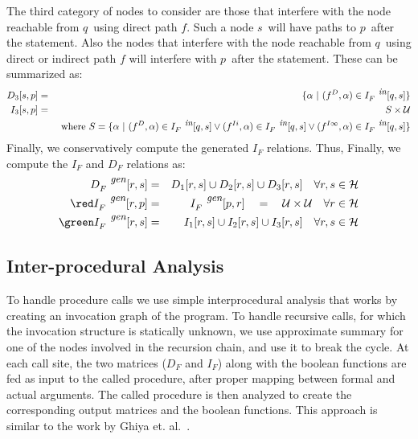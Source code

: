 \documentclass[runningheads,a4paper]{llncs}
\newcommand{\p}{\ensuremath{p}}
\newcommand{\q}{\ensuremath{q}}
\newcommand{\s}{\ensuremath{s}}
\newcommand{\myr}{\ensuremath{r}}
\newcommand{\drct}{\ensuremath{D}}
\newcommand{\indrct}{\ensuremath{I}}
\newcommand{\heap}{\ensuremath{\mathcal{H}}}
\newcommand{\upath}{\ensuremath{\mathcal{U}}}
\newcommand{\din}{\mbox{\footnotesize\em in}}
\newcommand{\dgen}{\mbox{\footnotesize\em gen}}
\begin{document}
\begin{enumerate}
The third category of nodes to consider are those that
interfere with the node reachable from \q\ using direct path
$f$. Such a node \s\ will have paths to \p\ after the
statement. {\green Also the nodes that interfere with the node reachable from \q\ using direct or indirect path
$f$ will interfere with \p\ after the statement. These can be summarized as:}
\begin{eqnarray*}
  D_3[\s, \p] &=& \{ \alpha \ \vert \ (f^{\drct}, \alpha) \in I_F^{\din}[\q, \s] \} \\
  I_3[\s, \p] &=& S \times \upath \\
		&& \text{ where } S = \{ \alpha \ \vert \ (f^{\drct}, \alpha) \in
  I_F^{\din}[\q, \s] \vee  (f^{\indrct i}, \alpha) \in I_F^{\din}[\q, \s] \vee (f^{\indrct\infty}, \alpha) \in I_F^{\din}[\q, \s]\} 
\end{eqnarray*}
{\red Finally, we conservatively compute the generated $I_F$ relations. Thus, }
{\green Finally, we compute the $I_F$ and $D_F$ relations as:}
\begin{eqnarray*}
D_F^{\dgen}[\myr, \s] &= & D_1[\myr, \s] \cup D_2[\myr, \s] \cup D_3[\myr, \s] \quad \forall\myr,\s \in \heap \\
{\red I_F^{\dgen}[\myr, \p]} &= & I_F^{\dgen}[\p, \myr] \quad=\quad \upath \times \upath \quad \forall\myr  \in \heap \\
{\green I_F^{\dgen}[\myr, \s]} &= & I_1[\myr, \s] \cup I_2[\myr, \s] \cup I_3[\myr, \s] \quad \forall\myr,\s \in \heap \\
\end{eqnarray*}
\end{enumerate}

{\red
\subsection{Inter-procedural Analysis}
\label{Interprocedural_Analysis}
To handle procedure calls we use simple interprocedural
analysis that works by creating an invocation graph of the
program. To handle recursive calls, for which the invocation
structure is statically unknown, we use approximate summary
for one of the nodes involved in the recursion chain, and use
it to break the cycle. At each call site, the two matrices
($D_F$ and $I_F$) along with the boolean functions are fed as
input to the called procedure, after proper mapping between
formal and actual arguments. The called procedure is then
analyzed to create the corresponding output matrices and the
boolean functions. This approach is similar to the work by
Ghiya et. al.~\cite{Ghiya96,Ghiya96practicaltechniques}.
}
\end{document}
